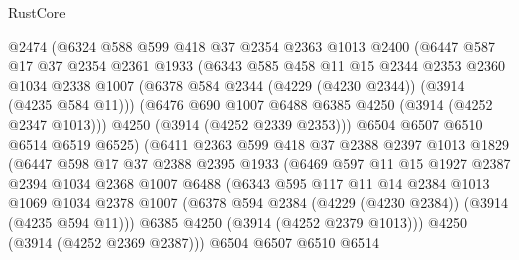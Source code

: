 \begin{lexlean}{RustCore}
\begin{coremodule}
                @2474
                (@6324
                  @588
                  @599
                  @418
                  @37
                  @2354
                  @2363
                  @1013
                  @2400
                  (@6447
                    @587
                    @17
                    @37
                    @2354
                    @2361
                    @1933
                    (@6343
                      @585
                      @458
                      @11
                      @15
                      @2344
                      @2353
                      @2360
                      @1034
                      @2338
                      @1007
                      (@6378 @584 @2344 (@4229 (@4230 @2344)) (@3914 (@4235 @584 @11)))
                      (@6476 @690 @1007 @6488 @6385 @4250 (@3914 (@4252 @2347 @1013)))
                      @4250
                      (@3914 (@4252 @2339 @2353)))
                    @6504
                    @6507
                    @6510
                    @6514
                    @6519
                    @6525)
                  (@6411
                    @2363
                    @599
                    @418
                    @37
                    @2388
                    @2397
                    @1013
                    @1829
                    (@6447
                      @598
                      @17
                      @37
                      @2388
                      @2395
                      @1933
                      (@6469
                        @597
                        @11
                        @15
                        @1927
                        @2387
                        @2394
                        @1034
                        @2368
                        @1007
                        @6488
                        (@6343
                          @595
                          @117
                          @11
                          @14
                          @2384
                          @1013
                          @1069
                          @1034
                          @2378
                          @1007
                          (@6378 @594 @2384 (@4229 (@4230 @2384)) (@3914 (@4235 @594 @11)))
                          @6385
                          @4250
                          (@3914 (@4252 @2379 @1013)))
                        @4250
                        (@3914 (@4252 @2369 @2387)))
                      @6504
                      @6507
                      @6510
                      @6514

\end{coremodule}
\end{lexlean}
